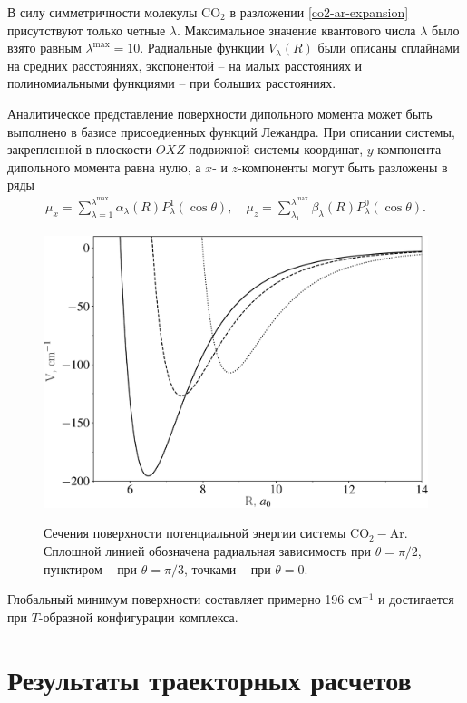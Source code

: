 В силу симметричности молекулы CO$_2$ в разложении \eqref{co2-ar-expansion} присутствуют только четные $\lambda$. Максимальное значение квантового числа $\lambda$ было взято равным $\lambda^\text{max} = 10$. Радиальные функции $V_\lambda(R)$ были описаны сплайнами на средних расстояниях, экспонентой -- на малых расстояниях и полиномиальными функциями -- при больших расстояниях. \par
Аналитическое представление поверхности дипольного момента может быть выполнено в базисе присоедиенных функций Лежандра. При описании системы, закрепленной в плоскости $OXZ$ подвижной системы координат, $y$-компонента дипольного момента равна нулю, а $x$- и $z$-компоненты могут быть разложены в ряды \cite{meyer1986_h2he}
\begin{gather}
    \mu_x = \sum_{\lambda = 1}^{\lambda^\text{max}} \alpha_\lambda(R) P_\lambda^1(\cos \theta), \quad \mu_z = \sum_{\lambda_1}^{\lambda^\text{max}} \beta_\lambda(R) P_\lambda^0(\cos \theta).
\end{gather}

\begin{figure}[H]
    \centering
    \includegraphics[width = 0.75\linewidth]{./pictures/co2-ar-potential-crop.pdf}
    \label{fig:co2-ar-potential}
    \caption{Сечения поверхности потенциальной энергии системы CO$_2-$Ar. Сплошной линией обозначена радиальная зависимость при $\theta = \pi/2$, пунктиром -- при $\theta = \pi/3$, точками -- при $\theta = 0$.}
\end{figure}

Глобальный минимум поверхности составляет примерно 196 см$^{-1}$ и достигается при $T$-образной конфигурации комплекса.

\section{Результаты траекторных расчетов}

